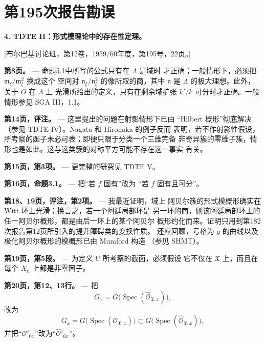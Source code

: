 \clearpage
\chapter*{第195次报告勘误}
\setcounter{footnote}{0}

\noindent\textbf{4. TDTE II：形式模理论中的存在性定理。}

\begin{center}
[布尔巴基讨论班，第12卷，1959/60年度，第195号，22页。]
\end{center}

\noindent\textbf{第8页。} --- 命题5.1中所写的公式只有在 $\Lambda$ 是域时
才正确；一般情形下，必须把 $\mathfrak m_\xi/\mathfrak m_\xi^2$ 换成这个
空间对 $\mathfrak n_\xi/\mathfrak n_\xi^2$ 的像所取的商，其中
$\mathfrak n$ 是 $\Lambda$ 的极大理想。此外，关于 $O$ 在 $\Lambda$ 上
光滑所给出的定义，只有在剩余域扩张 $k'/k$ 可分时才正确。一般情形参见
SGA III，1.1。

\noindent\textbf{第14页，评注。} --- 这里提出的问题在射影情形下已由
“Hilbert 概形”彻底解决（参见 TDTE IV）。Nagata 和 Hironaka 的例子反而
表明，若不作射影性假设，所考察的函子未必可表；即便只限于分类一个三维完备
非奇异簇的零维子簇，情形也是如此。这与这类簇的对称平方可能不存在这一事实
有关。

\noindent\textbf{第15页，第3项。} --- 更完整的研究见 TDTE V。

\noindent\textbf{第16页，命题3.1。} --- 把“若 $f$ 固有”改为
“若 $f$ 固有且可分”。

\noindent\textbf{第18、19页，评注，第2项。} --- 我最近证明，域上
阿贝尔簇的形式模概形确实在 Witt 环上光滑；换言之，若一个阿廷局部环是
另一环的商，则该阿廷局部环上的任一阿贝尔概形，都是由后一环上的某个阿贝尔
概形约化而来。证明只用到第182次报告第12页所引入的提升障碍类的变换性质。
还应回顾，亏格为 $g$ 的曲线以及极化阿贝尔概形的模概形已由 Mumford 构造
（参见 SHMT）。

\noindent\textbf{第19页，第5段。} --- 为定义 $U$ 所考察的截面，必须假设
它不仅在 $\mathfrak X$ 上，而且在每个 $X_n$ 上都是非零因子。

\noindent\textbf{第20页，第12、13行。} --- 把
\[
  G_x=G\bigl(\operatorname{Spec}(\widehat{\mathcal O}_{\mathfrak X,x})\bigr),
\]
改为
\[
  G_x=G\bigl(\operatorname{Spec}(\mathcal O_{\mathfrak X,x})\bigr)
  \subset
  G\bigl(\operatorname{Spec}(\widehat{\mathcal O}_{\mathfrak X,x})\bigr),
\]
并把“$\mathcal O'_{0x}$”改为“$\widehat{\mathcal O}'_{0x}$”。

\par
